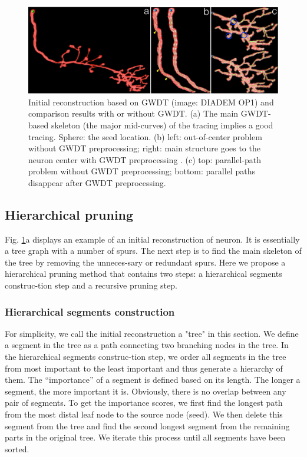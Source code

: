\begin{figure}[htbp]
\centering
\includegraphics[width=1.0\textwidth]{images/autont_fig2}
\caption[Initial reconstruction based on GWDT and comparison results with or without GWDT]{Initial reconstruction based on GWDT (image: DIADEM OP1) and comparison results with or without GWDT. (a) The main GWDT-based skeleton (the major mid-curves) of the tracing implies a good tracing.  Sphere: the seed location. (b) left: out-of-center problem without GWDT preprocessing; right:  main structure goes to the neuron center with GWDT preprocessing . (c) top: parallel-path problem without GWDT preprocessing; bottom: parallel paths disappear after GWDT preprocessing.}
\label{fig:autont-fig2}
\end{figure}
\subsection{Hierarchical pruning}\label{sec:nt-hp}
Fig. \ref{fig:autont-fig2}a displays an example of an initial reconstruction of neuron. It is essentially a tree graph with a number of spurs. The next step is to find the main skeleton of the tree by removing the unneces-sary or redundant spurs. Here we propose a hierarchical pruning method that contains two steps: a hierarchical segments construc-tion step and a recursive pruning step. 
\subsubsection{Hierarchical segments construction}
For simplicity, we call the initial reconstruction a "tree" in this section. We define a segment in the tree as a path connecting two branching nodes in the tree. In the hierarchical segments construc-tion step, we order all segments in the tree from most important to the least important and thus generate a hierarchy of them. The “importance” of a segment is defined based on its length. The longer a segment, the more important it is. Obviously, there is no overlap between any pair of segments. To get the importance scores, we first find the longest path from the most distal leaf node to the source node (seed). We then delete this segment from the tree and find the second longest segment from the remaining parts in the original tree. We iterate this process until all segments have been sorted. 

